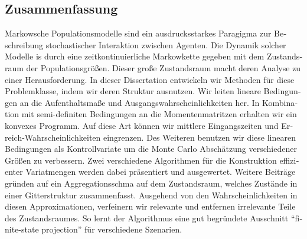 \begin{otherlanguage}{ngerman}
\chapter*{Zusammenfassung}
Markowsche Populationsmodelle sind ein ausdrucksstarkes Paragigma zur Beschreibung stochastischer Interaktion zwischen Agenten.
Die Dynamik solcher Modelle is durch eine zeitkontinuierliche Markowkette gegeben mit dem Zustandsraum der Populationsgrößen.
Dieser große Zustandsraum macht deren Analyse zu einer Herausforderung.
In dieser Dissertation entwickeln wir Methoden für diese Problemklasse, indem wir deren Struktur ausnutzen.
Wir leiten lineare Bedingungen an die Aufenthaltsmaße und Ausgangswahrscheinlichkeiten her.
In Kombination mit semi-definiten Bedingungen an die Momentenmatritzen erhalten wir ein konvexes Programm.
Auf diese Art können wir mittlere Eingangszeiten und Erreich-Wahrscheinlichkeiten eingrenzen.
Des Weiteren benutzen wir diese linearen Bedingungen als Kontrollvariate um die Monte Carlo Abschätzung verschiedener Größen zu verbessern.
Zwei verschiedene Algorithmen für die Konstruktion effizienter Variatmengen werden dabei präsentiert und ausgewertet.
Weitere Beiträge gründen auf ein Aggregationsschma auf dem Zustandsraum, welches Zustände in einer Gitterstruktur zusammenfasst.
Ausgehend von den Wahrscheinlichkeiten in diesen Approximationen, verfeinern wir relevante und entfernen irrelevante Teile des Zustandsraumes.
So lernt der Algorithmus eine gut begründete Ausschnitt ``finite-state projection'' für verschiedene Szenarien.
\end{otherlanguage}


\vfill
